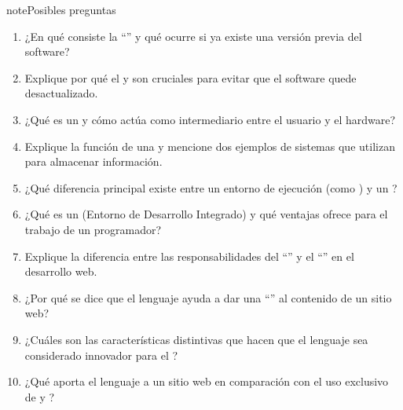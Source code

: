 \documentclass[letterpaper,10pt,spanish]{sphinxmanual}
\begin{document}
\begin{sphinxadmonition}{note}{Posibles preguntas}
\begin{enumerate}
\item {} 
\sphinxAtStartPar
¿En qué consiste la “” y qué ocurre si ya existe una versión previa del software?

\item {} 
\sphinxAtStartPar
Explique por qué el  y  son cruciales para evitar que el software quede desactualizado.

\item {} 
\sphinxAtStartPar
¿Qué es un  y cómo actúa como intermediario entre el usuario y el hardware?

\item {} 
\sphinxAtStartPar
Explique la función de una  y mencione dos ejemplos de sistemas que utilizan  para almacenar información.

\item {} 
\sphinxAtStartPar
¿Qué diferencia principal existe entre un entorno de ejecución (como ) y un ?

\item {} 
\sphinxAtStartPar
¿Qué es un  (Entorno de Desarrollo Integrado) y qué ventajas ofrece para el trabajo de un programador?

\item {} 
\sphinxAtStartPar
Explique la diferencia entre las responsabilidades del “” y el “” en el desarrollo web.

\item {} 
\sphinxAtStartPar
¿Por qué se dice que el lenguaje  ayuda a dar una “” al contenido de un sitio web?

\item {} 
\sphinxAtStartPar
¿Cuáles son las características distintivas que hacen que el lenguaje  sea considerado innovador para el ?

\item {} 
\sphinxAtStartPar
¿Qué aporta el lenguaje  a un sitio web en comparación con el uso exclusivo de  y ?

\end{enumerate}
\end{sphinxadmonition}
\end{document}
